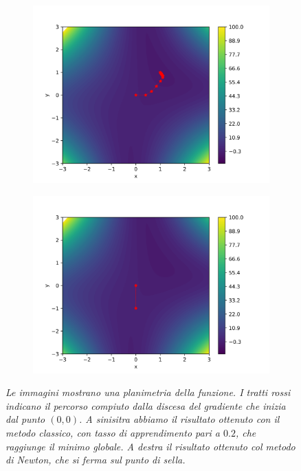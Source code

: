 \documentclass{article}
\begin{document}
\begin{figure}[htbp]
     \centering
     \begin{subfigure}{.49\textwidth}
        \centering
        \includegraphics[width=1 \textwidth]{images/gradient_descent.png}
     \end{subfigure}
     \begin{subfigure}{.49\textwidth}
        \centering
        \includegraphics[width=1\textwidth]{images/newton_method.png}
    \end{subfigure} 
    \caption{\emph{Le immagini mostrano una planimetria della funzione. I tratti rossi indicano il percorso compiuto dalla discesa del gradiente che inizia dal punto $(0,0)$. A sinisitra abbiamo il risultato ottenuto con il metodo classico, con tasso di apprendimento pari a $0.2$, che raggiunge il minimo globale. A destra il risultato ottenuto col metodo di Newton, che si ferma sul punto di sella.}}
    \label{fig:countour_plot}
\end{figure}
\end{document}
